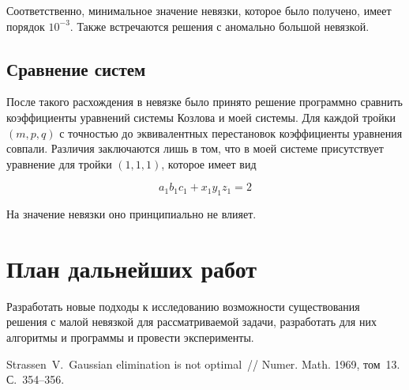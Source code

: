 \documentclass[12pt]{article}
\begin{document}
    Соответственно, минимальное значение невязки, которое было получено, имеет порядок $10^{-3}$.
    Также встречаются решения с аномально большой невязкой.

    \subsection{Сравнение систем}

    После такого расхождения в невязке было принято решение программно сравнить коэффициенты уравнений системы
    Козлова и моей системы.
    Для каждой тройки $ (m, p, q) $ с точностью до эквивалентных перестановок коэффициенты уравнения совпали.
    Различия заключаются лишь в том, что в моей системе присутствует уравнение для тройки $ (1, 1, 1) $, которое имеет
    вид


    \begin{equation}
        a_{1}b_{1}c_{1} + x_{1}y_{1}z_{1} = 2\label{eq:5}
    \end{equation}

    На значение невязки оно принципиально не влияет.


    \section{План дальнейших работ}

    Разработать новые подходы к исследованию возможности существования решения с малой невязкой для рассматриваемой задачи, разработать для них алгоритмы и программы и провести эксперименты.

    \begin{thebibliography}{99}
         Strassen~V.\, Gaussian elimination is not optimal~// Numer. Math. 1969, том~13. С.~354--356.
    \end{thebibliography}
\end{document}
